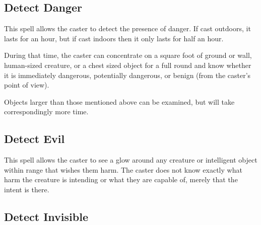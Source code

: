 \begin{multicols*}{2}
\subsection{Detect Danger}\label{spell:Detect Danger}

This spell allows the caster to detect the presence of danger. If cast outdoors, it lasts for an hour, but if cast indoors then it only lasts for half an hour.

During that time, the caster can concentrate on a square foot of ground or wall, human-sized creature, or a chest sized object for a full round and know whether it is immediately dangerous, potentially dangerous, or benign (from the caster’s point of view).

Objects larger than those mentioned above can be examined, but will take correspondingly more time.

\subsection{Detect Evil}\label{spell:Detect Evil}

This spell allows the caster to see a glow around any creature or intelligent object within range that wishes them harm. The caster does not know exactly what harm the creature is intending or what they are capable of, merely that the intent is there.

\subsection{Detect Invisible}\label{spell:Detect Invisible}


\end{multicols*}
